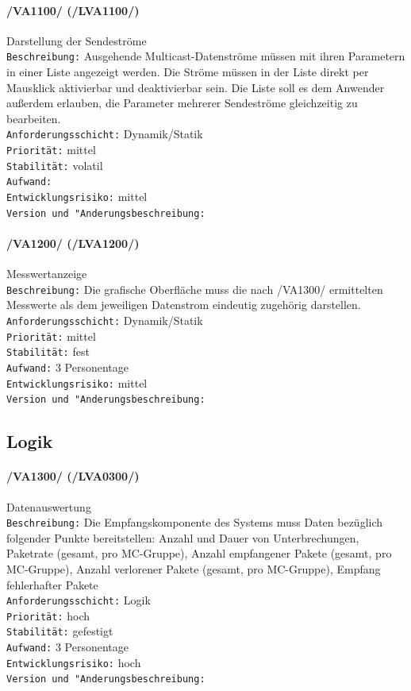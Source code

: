 \paragraph{/VA1100/ (/LVA1100/)} Darstellung der Sendeströme\\
\texttt{Beschreibung:} Ausgehende Multicast-Datenströme müssen mit ihren
Parametern in einer Liste angezeigt werden. Die Ströme müssen in der Liste
direkt per Mausklick aktivierbar und deaktivierbar sein. Die Liste soll es dem
Anwender außerdem erlauben, die Parameter mehrerer Sendeströme gleichzeitig zu
bearbeiten.\\
\texttt{Anforderungsschicht:} Dynamik/Statik\\
\texttt{Priorität:} mittel\\
\texttt{Stabilität:} volatil\\
\texttt{Aufwand:}\\
\texttt{Entwicklungsrisiko:} mittel\\
\texttt{Version und "Anderungsbeschreibung:}

\paragraph{/VA1200/ (/LVA1200/)} Messwertanzeige\\
\texttt{Beschreibung:} Die grafische Oberfläche muss die nach /VA1300/
ermittelten Messwerte als dem jeweiligen Datenstrom eindeutig zugehörig
darstellen.\\
\texttt{Anforderungsschicht:} Dynamik/Statik\\
\texttt{Priorität:} mittel\\
\texttt{Stabilität:} fest\\
\texttt{Aufwand:} 3 Personentage\\
\texttt{Entwicklungsrisiko:} mittel\\
\texttt{Version und "Anderungsbeschreibung:}

\subsection{Logik}
\label{sec:logik}

\paragraph{/VA1300/ (/LVA0300/)} Datenauswertung\\
\texttt{Beschreibung:} Die Empfangskomponente des Systems muss Daten bezüglich
folgender Punkte bereitstellen: Anzahl und Dauer von Unterbrechungen, Paketrate
(gesamt, pro MC-Gruppe), Anzahl empfangener Pakete (gesamt, pro MC-Gruppe),
Anzahl verlorener Pakete (gesamt, pro MC-Gruppe), Empfang fehlerhafter Pakete\\
\texttt{Anforderungsschicht:} Logik\\
\texttt{Priorität:} hoch\\
\texttt{Stabilität:} gefestigt\\
\texttt{Aufwand:} 3 Personentage\\
\texttt{Entwicklungsrisiko:} hoch\\
\texttt{Version und "Anderungsbeschreibung:}

